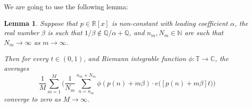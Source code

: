 \documentclass[11pt]{amsart}
\newcommand{\C}{\mathbb{C}}
\newcommand{\T}{\mathbb{T}}
\newcommand{\R}{\mathbb{R}}
\newcommand{\N}{\mathbb{N}}
\newcommand{\Z}{\mathbb{Z}}
\theoremstyle{plain}
\newtheorem{lemma}[theorem]{Lemma}
\theoremstyle{definition}
\theoremstyle{remark}
\begin{document}
We are going to use the following lemma:

\begin{lemma}\label{L:t}
  Suppose that $p\in \R[x]$ is non-constant with leading coefficient
  $\alpha$, the real number $\beta$ is such that
  $1/\beta \notin \mathbb{Q}/ \alpha+\mathbb{Q}$, and
  $n_m,N_m\in\N$ are such that $N_m\to\infty$ as $m\to\infty$.

  Then for every $t\in (0,1)$, and Riemann integrable function
  $\phi\colon \T\to \C$, the averages
$$
\frac{1}{M}\sum_{m=1}^M\Big(\frac{1}{N_m} \sum_{n=n_m}^{n_m+N_m}
\phi(p(n)+m\beta)\cdot e\big([p(n)+m\beta]t\big)\Big)
$$
converge to zero as $M\to\infty$.
\end{lemma}
\end{document}
